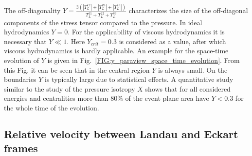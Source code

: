 The off-diagonality $Y = \frac{3(|T^{12}_L| + |T^{23}_L| +
|T^{13}_L|)}{T^{11}_L + T^{22}_L + T^{33}_L}$ characterizes the size of the
off-diagonal components of the stress tensor compared to the pressure. In ideal
hydrodynamics $Y = 0$. For the applicability of viscous hydrodynamics it is
necessary that $Y \ll 1$. Here $Y_{crit} = 0.3$ is considered as a value, after which
viscous hydrodynamics is hardly applicable. An example for the space-time
evolution of $Y$ is given in Fig.~\ref{FIG:y_paraview_space_time_evolution}.
From this Fig. it can be seen that in the central region $Y$ is always small.
On the boundaries $Y$ is typically large due to statistical effects. A
quantitative study similar to the study of the pressure isotropy $X$ shows that
for all considered energies and centralities more than 80\% of the event plane
area have $Y < 0.3$ for the whole time of the evolution.

\subsection{Relative velocity between Landau and Eckart frames}


